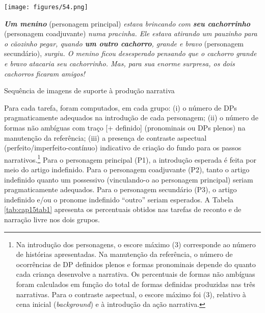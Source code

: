 \documentclass[output=paper,colorlinks,citecolor=brown,booklanguage=portuguese]{langscibook}
\begin{document}
\begin{Figura}[t]
 \texttt{[image: figures/54.png]}


\parbox{\textwidth}{\noindent\raggedright
\textbf{\emph{Um menino}} (personagem principal) \emph{estava brincando com \textbf{seu cachorrinho}} (personagem coadjuvante) \emph{numa pracinha. Ele estava atirando um pauzinho para o cãozinho pegar, quando \textbf{um outro cachorro}, grande e bravo} (personagem secundário), \emph{surgiu. O menino ficou desesperado pensando que o cachorro grande e bravo atacaria seu cachorrinho. Mas, para sua enorme surpresa, os dois cachorros ficaram amigos!}
}


    \caption{Sequência de imagens de suporte à produção narrativa}
    \label{fig:cap15fig2}
\end{Figura}



Para cada tarefa, foram computados, em cada grupo: (i) o número de DPs pragmaticamente adequados na introdução de cada personagem; (ii) o número de formas não ambíguas com traço [+ definido] (pronominais ou DPs plenos) na manutenção da referência; (iii) a presença de contraste aspectual (perfeito/imper\-feito-contínuo) indicativo de criação do fundo para os passos narrativos.\footnote{Na introdução dos personagens, o escore máximo (3) corresponde ao número de histórias apresentadas. Na manutenção da referência, o número de ocorrências de DP definidos plenos e formas pronominais depende do quanto cada criança desenvolve a narrativa. Os percentuais de formas não ambíguas foram calculados em função do total de formas definidas produzidas nas três narrativas. Para o contraste aspectual, o escore máximo foi (3), relativo à cena inicial (\emph{background}) e à introdução da ação narrativa.} Para o personagem principal (P1), a introdução esperada é feita por meio do artigo indefinido. Para o personagem coadjuvante (P2), tanto o artigo indefinido quanto um possessivo (vinculando-o ao personagem principal) seriam pragmaticamente adequados. Para o personagem secundário (P3), o artigo indefinido e/ou o prono\-me indefinido “outro” seriam esperados. A Tabela \ref{tab:cap15tab1} apresenta os percentuais obtidos nas tarefas de reconto e de narração livre nos dois grupos. 
\end{document}
